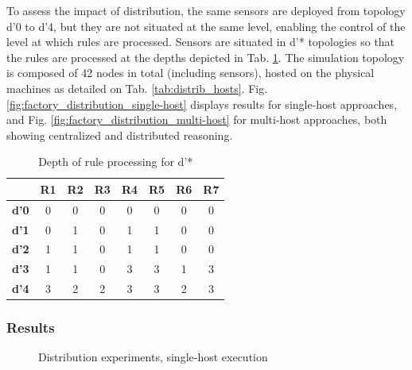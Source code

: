 \documentclass{iosart2c}
\begin{document}
To assess the impact of distribution, the same sensors are deployed from topology d'0 to d'4, but they are not situated at the same level, enabling the control of the level at which rules are processed.
Sensors are situated in d'* topologies so that the rules are processed at the depths depicted in Tab. \ref{tab:factory_distrib_topologies}.
The simulation topology is composed of 42 nodes in total (including sensors), hosted on the physical machines as detailed on Tab. \ref{tab:distrib_hosts}.
Fig. \ref{fig:factory_distribution_single-host} displays results for single-host approaches, and Fig. \ref{fig:factory_distribution_multi-host} for multi-host approaches, both showing centralized and distributed reasoning. 

\begin{table}
	\centering
	\caption{Depth of rule processing for d'*}
	\label{tab:factory_distrib_topologies}
	\begin{tabular}{|c|c|c|c|c|c|c|c|}
		\hline
		&\textbf{R1}&\textbf{R2}&\textbf{R3}&\textbf{R4}&\textbf{R5}&\textbf{R6}&\textbf{R7}\\ \hline
		\textbf{d'0}& 0& 0& 0& 0& 0& 0& 0\\ \hline
		\textbf{d'1}& 0& 1& 0& 1& 1& 0& 0\\ \hline
		\textbf{d'2}& 1& 1& 0& 1& 1& 0& 0\\ \hline
		\textbf{d'3}& 1& 1& 0& 3& 3& 1& 3\\ \hline
		\textbf{d'4}& 3& 2& 2& 3& 3& 2& 3\\ \hline
	\end{tabular}
\end{table}

\subsubsection{Results}

\begin{figure}
	\Centering
	\caption{\Centering Distribution experiments, single-host execution}
	\label{fig:factory_distribution_single-host}
	\begin{minipage}{0.395\textwidth}
		\Centering
		\label{fig:factory_distribution_raw_syn}
		\scalebox{0.8}{
			
		}
	
	\end{minipage}
	\begin{minipage}{0.595\textwidth}
		\Centering
		\label{fig:factory_distribution_processed_syn}
		\scalebox{0.8}{
			
		}
	\end{minipage}
\end{figure}
	
\end{document}
